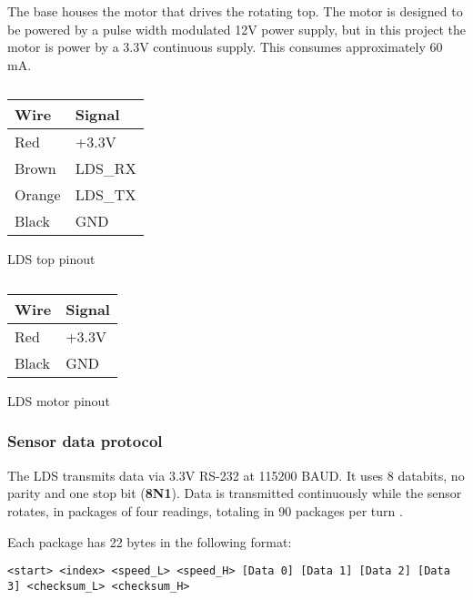 \documentclass[Main]{subfiles}
\begin{document}
		The base houses the motor that drives the rotating top.
		The motor is designed to be powered by a pulse width modulated 12V power supply, but in this project the motor is power by a 3.3V continuous supply.
		This consumes approximately 60 mA.

		\begin{table}[h]
			\begin{subtable}[b]{0.5\linewidth}
				\centering
					\begin{tabular}{|l|l|}
					\hline
					{\bf Wire} & {\bf Signal} \\ \hline
					Red        & +3.3V        \\ \hline
					Brown      & LDS\_RX      \\ \hline
					Orange     & LDS\_TX      \\ \hline
					Black      & GND          \\ \hline
				\end{tabular}
				\caption{LDS top pinout}
				\label{tab:lds_top}
			\end{subtable}
			\begin{subtable}[b]{0.5\linewidth}
				\centering
				\begin{tabular}{|l|l|}
					\hline
					{\bf Wire} & {\bf Signal} \\ \hline
					Red        & +3.3V        \\ \hline
					Black      & GND          \\ \hline
				\end{tabular}
				\caption{LDS motor pinout}
				\label{tab:lds_motor}
			\end{subtable}
			\caption{}
		\end{table}


		\subsubsection{Sensor data protocol} %
		\label{ssub:sensor_communication_protocol}
			The LDS transmits data via 3.3V RS-232 at 115200 BAUD.
			It uses 8 databits, no parity and one stop bit (\textbf{8N1}).
			Data is transmitted continuously while the sensor rotates, in packages of four readings, totaling in 90 packages per turn \cite{OpenSource}.

			Each package has 22 bytes in the following format:

			{\footnotesize\texttt{<start> <index> <speed\_L> <speed\_H> [Data 0] [Data 1] [Data 2] [Data 3] <checksum\_L> <checksum\_H>}}
\end{document}
